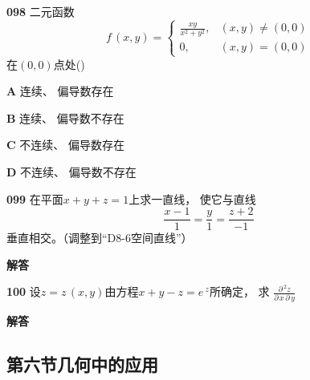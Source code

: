 \documentclass[a4paper,10pt]{article} %
\begin{document}


\textheight


\par\noindent \textbf{098} \quad 二元函数
\begin{equation*}    f\,(x,y) =
 \begin{cases}
    \displaystyle\frac{xy}{x^2+y^2}, & (x,y)\neq (0,0) \\
    0,                  & (x,y)=(0,0)
 \end{cases}                
\end{equation*}
在$(0,0)$点处\hfill (\quad\quad\quad)
\par\noindent \textbf{A} \quad 连续、 偏导数存在
\par\noindent \textbf{B} \quad 连续、 偏导数不存在
\par\noindent \textbf{C} \quad 不连续、 偏导数存在
\par\noindent \textbf{D} \quad 不连续、 偏导数不存在





\textheight


\par\noindent \textbf{099} \quad 在平面$x+y+z=1$上求一直线， 使它与直线
$$\frac{x-1}{1}=\frac{y}{1}=\frac{z+2}{-1}$$
垂直相交。（调整到“D8-6空间直线”）
\par\noindent \textbf{ 解答}





\textheight


\par\noindent \textbf{100} \quad 设$z=z\,(x,y)$由方程$x+y-z=e\,^z$所确定， 求
$\displaystyle\frac{\partial \,^2 z}{\partial \,x\,\partial \,y}$
\par\noindent \textbf{ 解答}





\textheight


\newpage
\subsection{第六节\quad 几何中的应用}
\end{document}
